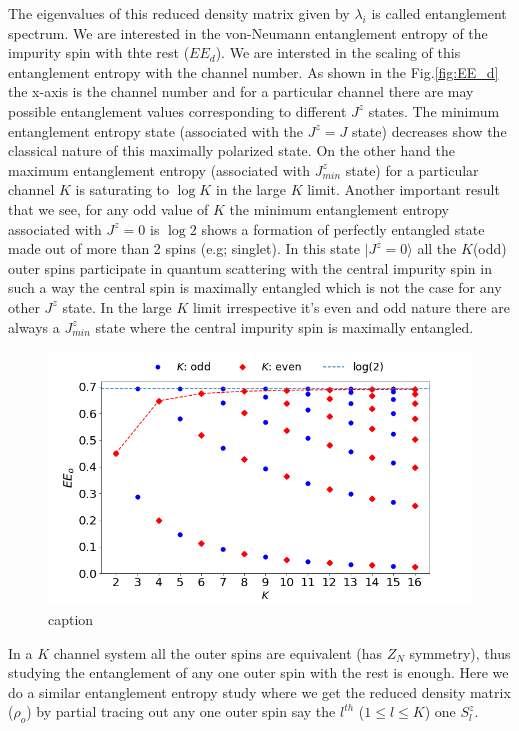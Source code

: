 \documentclass[reprint,prb,superscriptaddress]{revtex4-2}
\begin{document}
\noindent The eigenvalues of this reduced density matrix given by $\lambda_i$ is called entanglement spectrum. We are interested in the von-Neumann entanglement entropy of the impurity spin with thte rest ($EE_d$). We are intersted in the scaling of this entanglement entropy with the channel number. As shown in the Fig.\ref{fig:EE_d} the x-axis is the channel number and for a particular channel there are may possible entanglement values corresponding to different $J^z$ states. The minimum entanglement entropy state (associated with the $J^z=J$ state) decreases show the classical nature of this maximally polarized state. On the other hand the maximum entanglement entropy (associated with $J^z_{min}$ state) for a particular channel $K$ is saturating to $\log K$ in the large $K$ limit. Another important result that we see, for any odd value of $K$ the minimum entanglement entropy associated with $J^z=0$ is $\log 2$ shows a formation of perfectly entangled state made out of more than 2 spins (e.g; singlet). In this state $|J^z=0\rangle$ all the $K$(odd) outer spins participate in quantum scattering with the central impurity spin in such a way the central spin is maximally entangled which is not the case for any other $J^z$ state. In the large $K$ limit irrespective it's even and odd nature there are always a $J^z_{min}$ state where the central impurity spin is maximally entangled.
\begin{figure}[!htpb]
\centering
\includegraphics[scale=0.32]{plt/outer_EE_multi_channel_ANN.png}
\caption{caption}
\label{fig:EE_outer}
\end{figure}
In a $K$ channel system all the outer spins are equivalent (has $Z_N$ symmetry), thus studying the entanglement of any one outer spin with the rest is enough. Here we do a similar entanglement entropy study where we get the reduced density matrix ($\rho_o$) by partial tracing out any one outer spin say the $l^{th}$ ($1\leq l \leq K$) one $S^z_{l}$. 
\end{document}
